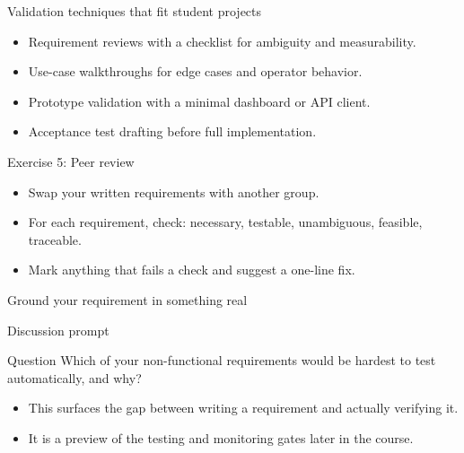 \begin{frame}{Validation techniques that fit student projects}
\begin{itemize}
\item Requirement reviews with a checklist for ambiguity and measurability.
\item Use-case walkthroughs for edge cases and operator behavior.
\item Prototype validation with a minimal dashboard or API client.
\item Acceptance test drafting before full implementation.
\end{itemize}
\coursefooter
\end{frame}

\begin{frame}{Exercise 5: Peer review}
\begin{itemize}
\item Swap your written requirements with another group.
\item For each requirement, check: necessary, testable, unambiguous, feasible, traceable.
\item Mark anything that fails a check and suggest a one-line fix.
\end{itemize}
\coursefooter
\end{frame}

\begin{frame}{Ground your requirement in something real}
\coursefooter
\end{frame}

\begin{frame}{Discussion prompt}
\begin{block}{Question}
Which of your non-functional requirements would be hardest to test automatically, and why?
\end{block}
\begin{itemize}
\item This surfaces the gap between writing a requirement and actually verifying it.
\item It is a preview of the testing and monitoring gates later in the course.
\end{itemize}
\coursefooter
\end{frame}

